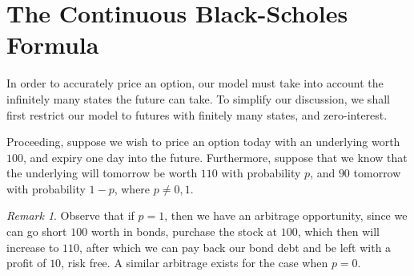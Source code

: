 \documentclass[12pt]{article}
\theoremstyle{plain}
\theoremstyle{definition}
\theoremstyle{remark}
\newtheorem*{remark}{Remark}
\numberwithin{equation}{section}  %
\begin{document}

\section{The Continuous Black-Scholes Formula}
In order to accurately price an option, our model must take into account the infinitely many states the future can take. To simplify our discussion, we shall first restrict our model to futures with finitely many states, and zero-interest. 

Proceeding, suppose we wish to price an option today with an underlying worth $100$,
and expiry one day into the future. Furthermore, suppose that we know
that the underlying will tomorrow be worth $110$ with probability $p$,
and $90$ tomorrow with probability $1-p$, where $p \neq 0,1$. 
\begin{remark}
	Observe that if $p=1$, then we have an arbitrage opportunity, since
	we can go short $100$ worth in bonds, purchase the stock at $100$, which then will increase to $110$, after which we can pay back our bond debt and be left with 
	a profit of $10$, risk free. A similar arbitrage exists for the case when $p=0$.
\end{remark}
\end{document}
